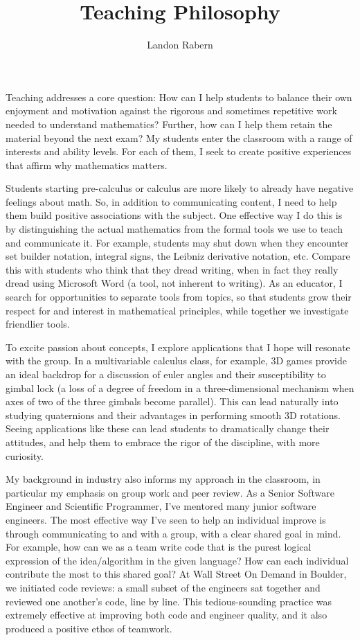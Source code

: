 \documentclass[12pt]{article}
\title{Teaching Philosophy}
\author{Landon Rabern}
\date{}
\begin{document}
\maketitle
Teaching addresses a core question: How can I help students to balance
their own enjoyment and motivation against the rigorous and sometimes repetitive
work needed to understand mathematics?
Further, how can I help them retain the material beyond the next
exam?  My students enter the classroom with a range of interests and
ability levels.  For each of them, I seek to create positive experiences that
affirm why mathematics matters.

Students starting pre-calculus or calculus 
are more likely to already have negative feelings about math. 
So, in addition to communicating content, I need to help them build
positive associations with the subject. 
One effective way I do this is by distinguishing the actual mathematics from 
the formal tools we use to teach and communicate it. 
For example, students may shut down when they encounter set builder notation,
integral signs, the Leibniz derivative notation, etc. 
Compare this with students who think that they dread writing, when in
fact they really dread using Microsoft Word (a tool, not inherent to writing).
As an educator, 
I search for opportunities to separate tools from topics, so that
students grow their respect for and interest in mathematical principles, while
together we investigate friendlier tools. 

To excite passion about concepts, I explore applications that I hope will
resonate with the group.  In a multivariable calculus class, for example, 3D
games provide an ideal backdrop for a discussion of euler angles and their
susceptibility to gimbal lock (a loss of a degree of freedom in a
three-dimensional mechanism when axes of two of the three gimbals become
parallel).  This can lead naturally into studying
quaternions and their advantages in performing smooth 3D rotations. 
Seeing applications like these can lead students to dramatically change their
attitudes, and help them to embrace the rigor of the discipline, with more
curiosity. 

My background in industry also informs my approach in the classroom, in particular
my emphasis on group work and peer review. As a Senior Software Engineer and
Scientific Programmer, I've mentored many junior software engineers. 
The most effective way I've seen to help an individual improve is through
communicating to and with a group, with a clear shared goal in mind. 
For example, how can we as a team write code that is the purest logical
expression of the idea/algorithm in the given language? 
How can each individual contribute the most to this shared goal? 
At Wall Street On Demand in Boulder, we initiated code reviews: 
a small subset of the engineers sat together and reviewed one another's code,
line by line. This tedious-sounding practice was extremely effective at
improving both code and engineer quality, 
and it also produced a positive ethos of teamwork. 
\end{document}
